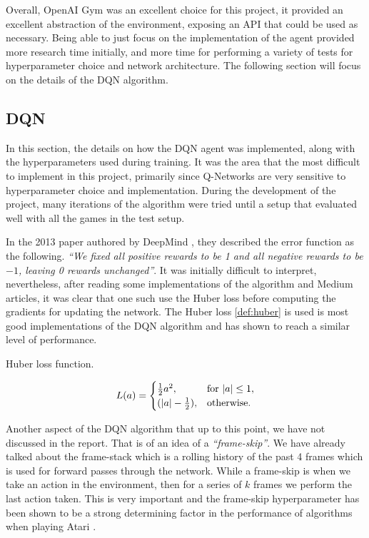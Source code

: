 Overall, OpenAI Gym was an excellent choice for this project, it provided an excellent abstraction of the environment, exposing an API that could be used as necessary. Being able to just focus on the implementation of the agent provided more research time initially, and more time for performing a variety of tests for hyperparameter choice and network architecture. The following section will focus on the details of the DQN algorithm.

\subsection{DQN}
\label{imple:dqn}

In this section, the details on how the DQN agent was implemented, along with the hyperparameters used during training. It was the area that the most difficult to implement in this project, primarily since Q-Networks are very sensitive to hyperparameter choice and implementation. During the development of the project, many iterations of the algorithm were tried until a setup that evaluated well with all the games in the test setup.

In the 2013 paper authored by DeepMind \cite{dqn}, they described the error function as the following. \textit{``We fixed all positive rewards to be 1 and all negative rewards to be $-1$, leaving 0 rewards unchanged''}. It was initially difficult to interpret, nevertheless, after reading some implementations of the algorithm and Medium articles, it was clear that one such use the Huber loss before computing the gradients for updating the network. The Huber loss \ref{def:huber} is used is most good implementations of the DQN algorithm and has shown to reach a similar level of performance.

\begin{defn}
	Huber loss function.

	\begin{equation}
		L(a)=\begin{cases}
			\frac{1}{2}a^2,          & \text{for $\abs{a} \leq 1$}, \\
			(\abs{a} - \frac{1}{2}), & \text{otherwise}.
		\end{cases}
	\end{equation}
	\label{def:huber}
\end{defn}

Another aspect of the DQN algorithm that up to this point, we have not discussed in the report. That is of an idea of a \textit{``frame-skip''}. We have already talked about the frame-stack which is a rolling history of the past 4 frames which is used for forward passes through the network. While a frame-skip is when we take an action in the environment, then for a series of $k$ frames we perform the last action taken. This is very important and the frame-skip hyperparameter has been shown to be a strong determining factor in the performance of algorithms when playing Atari \cite{braylan2015frame}.

